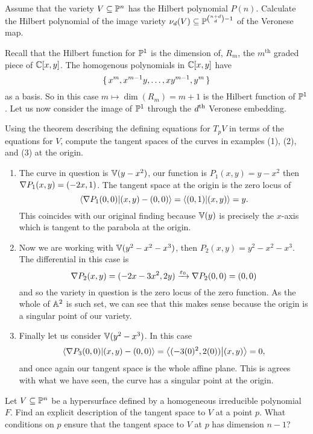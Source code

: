 \documentclass[12pt]{memoir}
\begin{document}
\begin{ptcbr}

\end{ptcbr}

\begin{Ej}
	Assume that the variety $V\subseteq\mathbb{P}^n$ has the Hilbert polynomial
	$P(n)$. Calculate the Hilbert polynomial of the image variety $\nu_d(V)\subseteq \mathbb{P}^{\binom{n+d}{d}-1}$ of the Veronese map. 
\end{Ej}

\begin{ptcbr}
Recall that the Hilbert function for $\mathbb{P}^1$ is the dimension of, $R_m$, the $m^{\text{th}}$ graded piece of $\mathbb{C}[x,y]$. The homogenous polynomials in $\mathbb{C}[x,y]$ have 
$$\{\,x^m,x^{m-1}y,\dots,xy^{m-1},y^m\,\}$$
as a basis. So in this case $m\mapsto \dim(R_m)=m+1$ is the Hilbert function of $\mathbb{P}^1$. Let us now consider the image of $\mathbb{P}^1$ through the $d\textsuperscript{th}$ Veronese embedding.
\end{ptcbr}

\begin{Ej}
	Using the theorem describing the defining equations for
	$T_pV$ in terms of the equations for $V$, compute the tangent spaces of the
	curves in examples (1), (2), and (3) at the origin.
\end{Ej}

\begin{ptcbr}
\begin{enumerate}
	\item The curve in question is $\mathbb{V}(y-x^2)$, our function is $P_1(x,y)=y-x^2$ then $\nabla P_1(x,y)=(-2x,1)$. The tangent space at the origin is the zero locus of 
	$$\braket{\nabla P_1(0,0)}{(x,y)-(0,0)}=\braket{(0,1)}{(x,y)}=y.$$
	This coincides with our original finding because $\mathbb{V}(y)$ is precisely the $x$-axis which is tangent to the parabola at the origin.
	\item Now we are working with $\mathbb{V}(y^2-x^2-x^3)$, then $P_2(x,y)=y^2-x^2-x^3$. The differential in this case is 
	$$\nabla P_2(x,y)=(-2x-3x^2,2y)\xrightarrow{\varepsilon_0}\nabla P_2(0,0)=(0,0)$$
	and so the variety in question is the zero locus of the zero function. As the whole of $\mathbb{A}^2$ is such set, we can see that this makes sense because the origin is a singular point of our variety. 
	\item Finally let us consider $\mathbb{V}(y^2-x^3)$. In this case 
	$$\braket{\nabla P_3(0,0)}{(x,y)-(0,0)}=\braket{(-3(0)^2,2(0))}{(x,y)}=0,$$
	and once again our tangent space is the whole affine plane. This is agrees with what we have seen, the curve has a singular point at the origin.
\end{enumerate}
\end{ptcbr}
\begin{Ej}
	Let $V\subseteq\mathbb{P}^n$ be a hypersurface defined by a homogeneous
	irreducible polynomial $F$. Find an explicit description of the tangent space
	to $V$ at a point $p$. What conditions on $p$ ensure that the tangent space to
	$V$ at $p$ has dimension $n - 1$?
\end{Ej}
\end{document}
